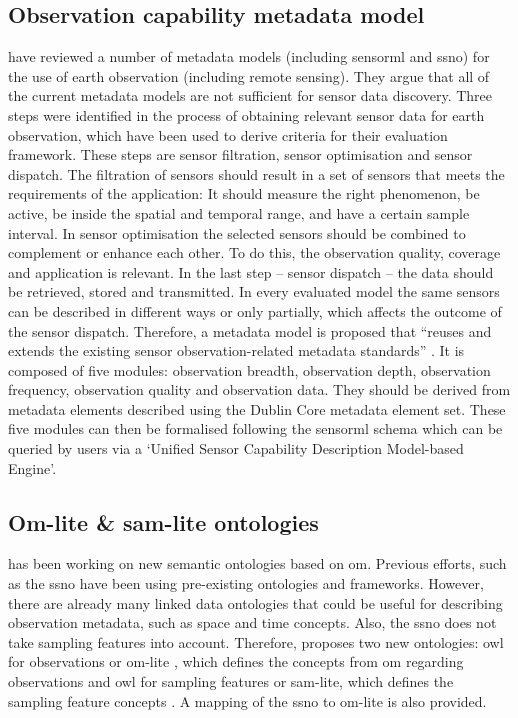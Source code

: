 \subsection{Observation capability metadata model} 
\cite{SW:Hu} have reviewed a number of metadata models (including \ac{sensorml} and \ac{ssno}) for the use of earth observation (including remote sensing). They argue that all of the current metadata models are not sufficient for sensor data discovery. Three steps were identified in the process of obtaining relevant sensor data for earth observation, which have been used to derive criteria for their evaluation framework. These steps are sensor filtration, sensor optimisation and sensor dispatch. The filtration of sensors should result in a set of sensors that meets the requirements of the application: It should measure the right phenomenon, be active, be inside the spatial and temporal range, and have a certain sample interval. In sensor optimisation the selected sensors should be combined to complement or enhance each other. To do this, the observation quality, coverage and application is relevant. In the last step -- sensor dispatch -- the data should be retrieved, stored and transmitted. In every evaluated model the same sensors can be described in different ways or only partially, which affects the outcome of the sensor dispatch. Therefore, a metadata model is proposed that \enquote{reuses and extends the existing sensor observation-related metadata standards} \cite[p. 10546]{SW:Hu}. It is composed of five modules: observation breadth, observation depth, observation frequency, observation quality and observation data. They should be derived from metadata elements described using the Dublin Core metadata element set. These five modules can then be formalised following the \ac{sensorml} schema which can be queried by users via a `Unified Sensor Capability Description Model-based Engine'. 

\subsection{Om-lite \& sam-lite ontologies}
\cite{SSW:Cox4} has been working on new semantic ontologies based on \ac{om}. Previous efforts, such as the \ac{ssno} have been using pre-existing ontologies and frameworks. However, there are already many linked data ontologies that could be useful for describing observation metadata, such as space and time concepts. Also, the \ac{ssno} does not take sampling features into account. Therefore, \cite{SSW:Cox4} proposes two new ontologies: \ac{owl} for observations or om-lite \citep{SSW:Cox3}, which defines the concepts from \ac{om} regarding observations and \ac{owl} for sampling features or sam-lite, which defines the sampling feature concepts \citep{SSW:Cox2}. A mapping of the \ac{ssno} to om-lite is also provided.

